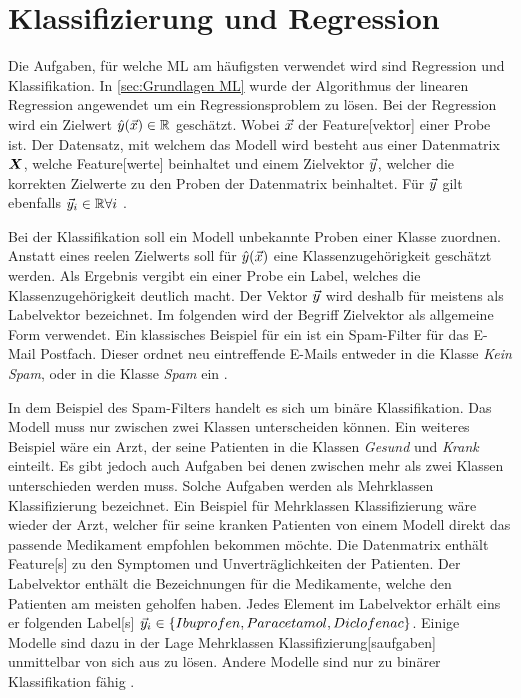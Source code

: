 \section{Klassifizierung und Regression}
Die Aufgaben, für welche \gls{ML} am häufigsten verwendet wird sind Regression und \gls{Klassifikation}. In \ref{sec:Grundlagen ML} wurde der Algorithmus der linearen Regression angewendet um ein Regressionsproblem zu lösen. Bei der Regression wird ein Zielwert \(\hat{y}(\vec{x}) \in \mathbb{R}\) geschätzt. Wobei \(\vec{x}\) der \gls{Feature}[vektor] einer Probe ist. Der Datensatz, mit welchem das Modell  wird besteht aus einer \gls{Datenmatrix} \(\boldsymbol{X}\), welche \gls{Feature}[werte] beinhaltet und einem \gls{Zielvektor} \(\vec{y}\), welcher die korrekten Zielwerte zu den Proben der \gls{Datenmatrix} beinhaltet. Für \(\vec{y}\) gilt ebenfalls \(\vec{y}_i \in \mathbb{R} \forall i \) \cite{Burkov.2019, ShalevShwartz.2014}. \par

Bei der \gls{Klassifikation} soll ein Modell unbekannte Proben einer Klasse zuordnen. Anstatt eines reelen Zielwerts soll für \(\hat{y}(\vec{x})\) eine Klassenzugehörigkeit geschätzt werden. Als Ergebnis vergibt ein  einer Probe ein \gls{Label}, welches die Klassenzugehörigkeit deutlich macht. Der Vektor \(\vec{y}\) wird deshalb für  meistens als \gls{Labelvektor} bezeichnet. Im folgenden wird der Begriff \gls{Zielvektor} als allgemeine Form verwendet. Ein klassisches Beispiel für ein  ist ein Spam-Filter für das E-Mail Postfach. Dieser ordnet neu eintreffende E-Mails entweder in die Klasse \textit{Kein Spam}, oder in die Klasse \textit{Spam} ein \cite{Burkov.2019}. \par

In dem Beispiel des Spam-Filters handelt es sich um binäre \gls{Klassifikation}. Das Modell muss nur zwischen zwei Klassen unterscheiden können. Ein weiteres Beispiel wäre ein Arzt, der seine Patienten in die Klassen \textit{Gesund} und \textit{Krank} einteilt. Es gibt jedoch auch Aufgaben bei denen zwischen mehr als zwei Klassen unterschieden werden muss. Solche Aufgaben werden als \gls{Mehrklassen Klassifizierung} bezeichnet. Ein Beispiel für \gls{Mehrklassen Klassifizierung} wäre wieder der Arzt, welcher für seine kranken Patienten von einem Modell direkt das passende Medikament empfohlen bekommen möchte. Die \gls{Datenmatrix} enthält \gls{Feature}[s] zu den Symptomen und Unverträglichkeiten der Patienten. Der \gls{Labelvektor} enthält die Bezeichnungen für die Medikamente, welche den Patienten am meisten geholfen haben. Jedes Element im \gls{Labelvektor} erhält eins er folgenden \gls{Label}[s] \(\vec{y}_i \in \{Ibuprofen, Paracetamol, Diclofenac\}\). Einige Modelle sind dazu in der Lage \gls{Mehrklassen Klassifizierung}[saufgaben] unmittelbar von sich aus zu lösen. Andere Modelle sind nur zu binärer \gls{Klassifikation} fähig \cite{Burkov.2019}.\par

